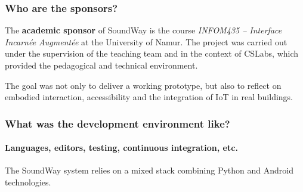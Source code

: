 \documentclass[12pt,a4paper]{article}
\begin{document}
\subsubsection{Who are the sponsors?}

The \textbf{academic sponsor} of SoundWay is the course \textit{INFOM435 -- Interface Incarnée Augmentée} at the University of Namur. The project was carried out under the supervision of the teaching team and in the context of CSLabs, which provided the pedagogical and technical environment.

The goal was not only to deliver a working prototype, but also to reflect on embodied interaction, accessibility and the integration of IoT in real buildings.

\pagebreak

\subsubsection{What was the development environment like?}

\paragraph{Languages, editors, testing, continuous integration, etc.}

The SoundWay system relies on a mixed stack combining Python and Android technologies.
\end{document}
